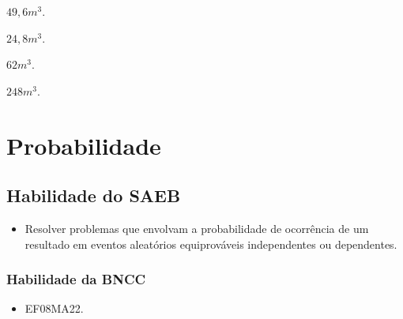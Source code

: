 \begin{escolha}[itemsep=0pt]
\item $49,6 m^3$.
\item $24,8 m^3$.
\item $62 m^3$.
\item $248 m^3$.
\end{escolha}










\chapter{Probabilidade}

\section*{Habilidade do SAEB}

\begin{itemize}
\item Resolver problemas que envolvam a probabilidade de
ocorrência de um resultado em eventos aleatórios equiprováveis
independentes ou dependentes.
\end{itemize}

\subsection{Habilidade da BNCC}

\begin{itemize}
  \item EF08MA22.
\end{itemize}

